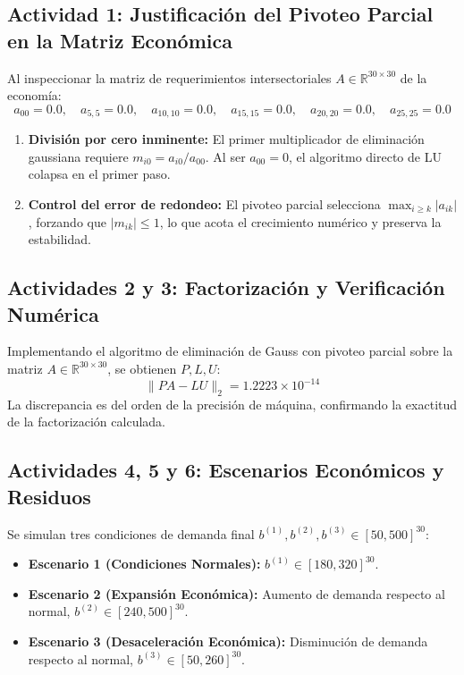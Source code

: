 \documentclass[11pt,a4paper]{article}
\theoremstyle{definition}
\theoremstyle{remark}
\begin{document}
\subsection{Actividad 1: Justificación del Pivoteo Parcial en la Matriz Económica}
Al inspeccionar la matriz de requerimientos intersectoriales $A \in \mathbb{R}^{30 \times 30}$ de la economía:
\begin{equation}
    a_{00} = 0.0, \quad a_{5,5} = 0.0, \quad a_{10,10} = 0.0, \quad a_{15,15} = 0.0, \quad a_{20,20} = 0.0, \quad a_{25,25} = 0.0
\end{equation}
\begin{enumerate}
    \item \textbf{División por cero inminente:} El primer multiplicador de eliminación gaussiana requiere $m_{i0} = a_{i0} / a_{00}$. Al ser $a_{00} = 0$, el algoritmo directo de LU colapsa en el primer paso.
    \item \textbf{Control del error de redondeo:} El pivoteo parcial selecciona $\max_{i \ge k} |a_{ik}|$, forzando que $|m_{ik}| \le 1$, lo que acota el crecimiento numérico y preserva la estabilidad.
\end{enumerate}

\subsection{Actividades 2 y 3: Factorización y Verificación Numérica}
Implementando el algoritmo de eliminación de Gauss con pivoteo parcial sobre la matriz $A \in \mathbb{R}^{30 \times 30}$, se obtienen $P, L, U$:
\begin{equation}
    \|P A - L U\|_2 = 1.2223 \times 10^{-14}
\end{equation}
La discrepancia es del orden de la precisión de máquina, confirmando la exactitud de la factorización calculada.

\subsection{Actividades 4, 5 y 6: Escenarios Económicos y Residuos}
Se simulan tres condiciones de demanda final $b^{(1)}, b^{(2)}, b^{(3)} \in [50, 500]^{30}$:
\begin{itemize}[leftmargin=*]
    \item \textbf{Escenario 1 (Condiciones Normales):} $b^{(1)} \in [180, 320]^{30}$.
    \item \textbf{Escenario 2 (Expansión Económica):} Aumento de demanda respecto al normal, $b^{(2)} \in [240, 500]^{30}$.
    \item \textbf{Escenario 3 (Desaceleración Económica):} Disminución de demanda respecto al normal, $b^{(3)} \in [50, 260]^{30}$.
\end{itemize}
\end{document}
